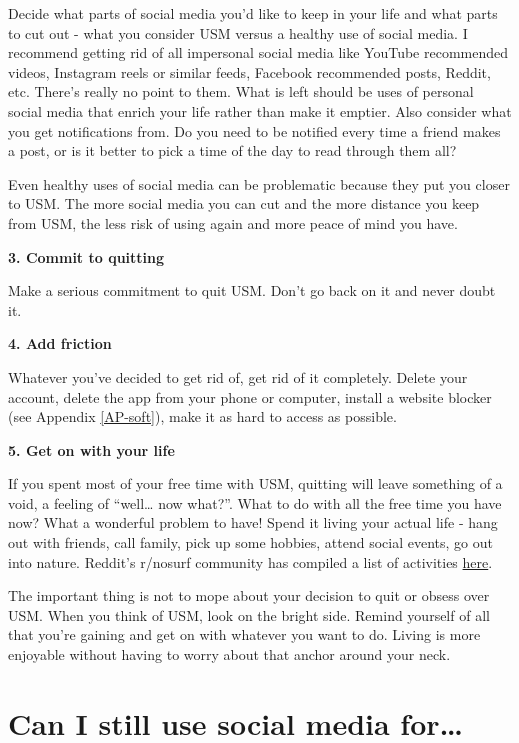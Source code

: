 \documentclass[
  openany]{book}
\begin{document}
Decide what parts of social media you'd like to keep in your life and what parts to cut out - what you consider USM versus a healthy use of social media. I recommend getting rid of all impersonal social media like YouTube recommended videos, Instagram reels or similar feeds, Facebook recommended posts, Reddit, etc. There's really no point to them. What is left should be uses of personal social media that enrich your life rather than make it emptier. Also consider what you get notifications from. Do you need to be notified every time a friend makes a post, or is it better to pick a time of the day to read through them all?

Even healthy uses of social media can be problematic because they put you closer to USM. The more social media you can cut and the more distance you keep from USM, the less risk of using again and more peace of mind you have.

\textbf{3. Commit to quitting}

Make a serious commitment to quit USM. Don't go back on it and never doubt it.

\textbf{4. Add friction}

Whatever you've decided to get rid of, get rid of it completely. Delete your account, delete the app from your phone or computer, install a website blocker (see Appendix \ref{AP-soft}), make it as hard to access as possible.

\textbf{5. Get on with your life}

If you spent most of your free time with USM, quitting will leave something of a void, a feeling of ``well\ldots{} now what?''. What to do with all the free time you have now? What a wonderful problem to have! Spend it living your actual life - hang out with friends, call family, pick up some hobbies, attend social events, go out into nature. Reddit's r/nosurf community has compiled a list of activities \href{https://www.reddit.com/r/nosurf/wiki/activities/}{here}.

The important thing is not to mope about your decision to quit or obsess over USM. When you think of USM, look on the bright side. Remind yourself of all that you're gaining and get on with whatever you want to do. Living is more enjoyable without having to worry about that anchor around your neck.

\section{Can I still use social media for\ldots{}}\label{can-i-still-use-social-media-for}
\end{document}
